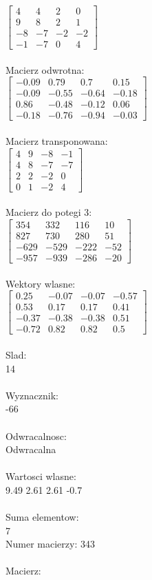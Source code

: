 \documentclass[a4paper,12pt]{article}
\begin{document}
$\begin{bmatrix} 4&4&2&0\\9&8&2&1\\-8&-7&-2&-2\\-1&-7&0&4 \end{bmatrix}$
\\
\\
Macierz odwrotna:\\

$\begin{bmatrix} -0.09&0.79&0.7&0.15\\-0.09&-0.55&-0.64&-0.18\\0.86&-0.48&-0.12&0.06\\-0.18&-0.76&-0.94&-0.03 \end{bmatrix}$
\\
\\
Macierz transponowana:\\

$\begin{bmatrix} 4&9&-8&-1\\4&8&-7&-7\\2&2&-2&0\\0&1&-2&4 \end{bmatrix}$
\\
\\
Macierz do potegi 3:\\

$\begin{bmatrix} 354&332&116&10\\827&730&280&51\\-629&-529&-222&-52\\-957&-939&-286&-20 \end{bmatrix}$
\\
\\
Wektory wlasne:\\

$\begin{bmatrix} 0.25&-0.07&-0.07&-0.57\\0.53&0.17&0.17&0.41\\-0.37&-0.38&-0.38&0.51\\-0.72&0.82&0.82&0.5 \end{bmatrix}$
\\
\\
Slad:\\
14
\\
\\
Wyznacznik:\\
-66
\\
\\
Odwracalnosc:\\
Odwracalna
\\
\\
Wartosci wlasne:\\
9.49 2.61 2.61 -0.7
\\
\\
Suma elementow:\\
7
\\
\newpage
Numer macierzy:
343
\\
\\
Macierz:\\
\end{document}
